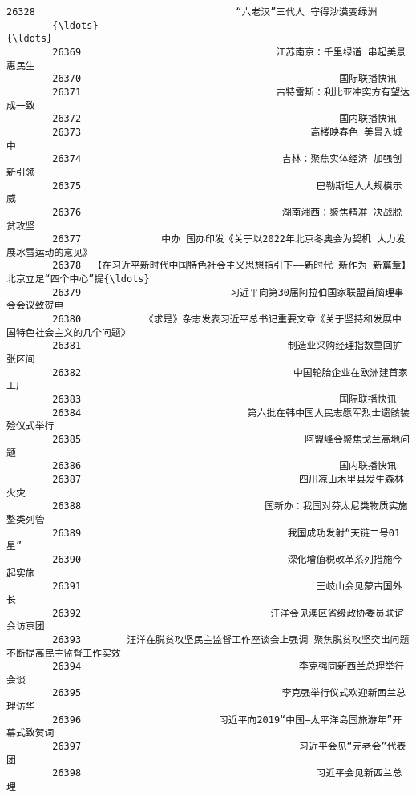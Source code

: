 \documentclass[11pt]{article}
\begin{document}
\begin{Verbatim}[commandchars=\\\{\}]
        26328                                   “六老汉”三代人 守得沙漠变绿洲   
        {\ldots}                                                  {\ldots}   
        26369                                  江苏南京：千里绿道 串起美景惠民生   
        26370                                             国际联播快讯   
        26371                                  古特雷斯：利比亚冲突方有望达成一致   
        26372                                             国内联播快讯   
        26373                                        高楼映春色 美景入城中   
        26374                                   吉林：聚焦实体经济 加强创新引领   
        26375                                         巴勒斯坦人大规模示威   
        26376                                   湖南湘西：聚焦精准 决战脱贫攻坚   
        26377              中办 国办印发《关于以2022年北京冬奥会为契机 大力发展冰雪运动的意见》   
        26378  【在习近平新时代中国特色社会主义思想指引下——新时代 新作为 新篇章】北京立足“四个中心”提{\ldots}   
        26379                          习近平向第30届阿拉伯国家联盟首脑理事会会议致贺电   
        26380           《求是》杂志发表习近平总书记重要文章《关于坚持和发展中国特色社会主义的几个问题》   
        26381                                    制造业采购经理指数重回扩张区间   
        26382                                     中国轮胎企业在欧洲建首家工厂   
        26383                                             国际联播快讯   
        26384                             第六批在韩中国人民志愿军烈士遗骸装殓仪式举行   
        26385                                       阿盟峰会聚焦戈兰高地问题   
        26386                                             国内联播快讯   
        26387                                      四川凉山木里县发生森林火灾   
        26388                                国新办：我国对芬太尼类物质实施整类列管   
        26389                                    我国成功发射“天链二号01星”   
        26390                                    深化增值税改革系列措施今起实施   
        26391                                         王岐山会见蒙古国外长   
        26392                                 汪洋会见澳区省级政协委员联谊会访京团   
        26393        汪洋在脱贫攻坚民主监督工作座谈会上强调 聚焦脱贫攻坚突出问题 不断提高民主监督工作实效   
        26394                                      李克强同新西兰总理举行会谈   
        26395                                   李克强举行仪式欢迎新西兰总理访华   
        26396                        习近平向2019“中国—太平洋岛国旅游年”开幕式致贺词   
        26397                                      习近平会见“元老会”代表团   
        26398                                         习近平会见新西兰总理   
        

\end{Verbatim}
\end{document}
